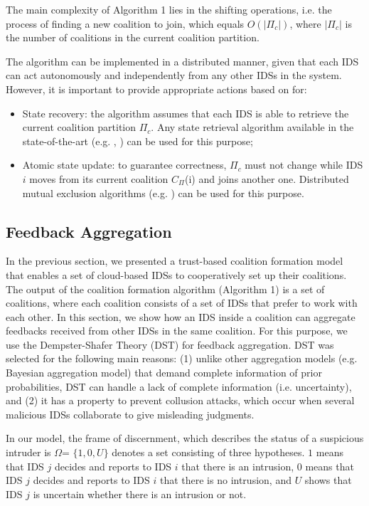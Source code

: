 \documentclass[conference]{IEEEtran}
\begin{document}
The main complexity of Algorithm 1 lies in the shifting operations, i.e. the process of finding a new coalition to join,
which equals $O(|\Pi_{c}|)$, where $|\Pi_{c}|$ is the number of coalitions in the current coalition partition.

The algorithm can be implemented in a distributed
manner, given that each IDS can act autonomously and independently from any other IDSs in the system.
However, it is important to provide appropriate actions
based on \cite{guazzone2014game} for:

\begin{itemize}
\item State recovery: the algorithm assumes that each IDS
is able to retrieve the current coalition partition $\Pi_{c}$. Any
state retrieval algorithm available in the state-of-the-art (e.g. \cite{sinha1998distributed}, \cite{wooldridge2009introduction})
can be used for this purpose;
\item Atomic state update: to guarantee correctness, $\Pi_{c}$
must not change while IDS $i$ moves from its current coalition $C_{\Pi}$(i) and joins
another one. Distributed mutual exclusion algorithms (e.g. \cite{kshemkalyani2011distributed})
can be used for this purpose.

\end{itemize}
\subsection{Feedback Aggregation}

In the previous section, we presented a trust-based coalition formation model that enables a set of cloud-based IDSs to cooperatively set up their coalitions. The output of the coalition formation algorithm (Algorithm 1) is a set of coalitions, where each coalition consists of a set of IDSs that prefer to work with each other. In this section, we show how an IDS inside a coalition can aggregate feedbacks received from other IDSs in the same coalition. For this purpose, we use the Dempster-Shafer Theory (DST) for feedback aggregation. DST was selected for the following main reasons: (1) unlike other aggregation models (e.g. Bayesian aggregation model) that demand complete information of prior probabilities, DST can handle a lack of complete information (i.e. uncertainty), and (2) it has a property
to prevent collusion attacks, which occur when several malicious IDSs collaborate to give misleading judgments.

In our model, the frame of discernment, which describes the status of a suspicious intruder is $\Omega$= $\{1, 0 ,U\}$ denotes a set consisting of three hypotheses. $1$ means that IDS $j$ decides and
reports to IDS $i$ that there is an intrusion, $0$ means that IDS $j$ decides and
reports to IDS $i$ that there is no intrusion, and
$U$ shows that IDS $j$ is uncertain whether there is an intrusion or not.
\end{document}

